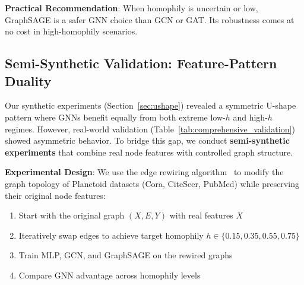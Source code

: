 \textbf{Practical Recommendation}: When homophily is uncertain or low, GraphSAGE is a safer GNN choice than GCN or GAT. Its robustness comes at no cost in high-homophily scenarios.

\subsection{Semi-Synthetic Validation: Feature-Pattern Duality}
\label{sec:semi_synthetic}

Our synthetic experiments (Section~\ref{sec:ushape}) revealed a symmetric U-shape pattern where GNNs benefit equally from both extreme low-$h$ and high-$h$ regimes. However, real-world validation (Table~\ref{tab:comprehensive_validation}) showed asymmetric behavior. To bridge this gap, we conduct \textbf{semi-synthetic experiments} that combine real node features with controlled graph structure.

\textbf{Experimental Design}: We use the edge rewiring algorithm~\cite{karrer2011stochastic} to modify the graph topology of Planetoid datasets (Cora, CiteSeer, PubMed) while preserving their original node features:
\begin{enumerate}
    \item Start with the original graph $(X, E, Y)$ with real features $X$
    \item Iteratively swap edges to achieve target homophily $h \in \{0.15, 0.35, 0.55, 0.75\}$
    \item Train MLP, GCN, and GraphSAGE on the rewired graphs
    \item Compare GNN advantage across homophily levels
\end{enumerate}

